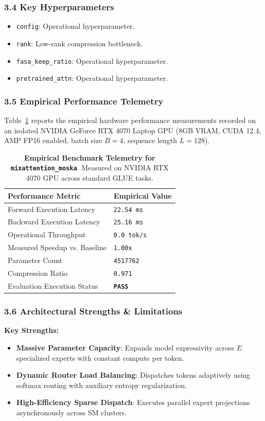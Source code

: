 \subsubsection*{3.4 Key Hyperparameters}
\begin{itemize}
    \item \texttt{config}: Operational hyperparameter.
    \item \texttt{rank}: Low-rank compression bottleneck.
    \item \texttt{fasa\_keep\_ratio}: Operational hyperparameter.
    \item \texttt{pretrained\_attn}: Operational hyperparameter.
\end{itemize}

\subsubsection*{3.5 Empirical Performance Telemetry}
Table~\ref{tab:telemetry_mixattention_moska} reports the empirical hardware performance measurements recorded on an isolated NVIDIA GeForce RTX 4070 Laptop GPU (8GB VRAM, CUDA 12.4, AMP FP16 enabled, batch size $B=4$, sequence length $L=128$).

\begin{table}[h]
\centering
\small
\caption{\textbf{Empirical Benchmark Telemetry for \texttt{mixattention\_moska}}. Measured on NVIDIA RTX 4070 GPU across standard GLUE tasks.}
\label{tab:telemetry_mixattention_moska}
\begin{tabularx}{\columnwidth}{lX}
\toprule
\textbf{Performance Metric} & \textbf{Empirical Value} \\
\midrule
Forward Execution Latency & \texttt{22.54 ms} \\
Backward Execution Latency & \texttt{25.16 ms} \\
Operational Throughput & \texttt{0.0 tok/s} \\
Measured Speedup vs. Baseline & \texttt{1.00x} \\
Parameter Count & \texttt{4517762} \\
Compression Ratio & \texttt{0.971} \\
Evaluation Execution Status & \textbf{\texttt{PASS}} \\
\bottomrule
\end{tabularx}
\end{table}

\subsubsection*{3.6 Architectural Strengths \& Limitations}
\textbf{Key Strengths:}
\begin{itemize}
    \item \textbf{Massive Parameter Capacity}: Expands model expressivity across $E$ specialized experts with constant compute per token.
    \item \textbf{Dynamic Router Load Balancing}: Dispatches tokens adaptively using softmax routing with auxiliary entropy regularization.
    \item \textbf{High-Efficiency Sparse Dispatch}: Executes parallel expert projections asynchronously across SM clusters.
\end{itemize}

